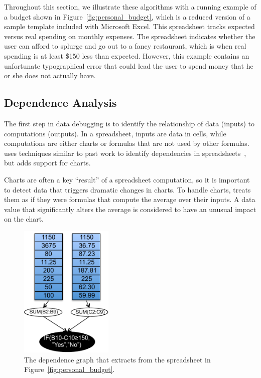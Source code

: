 Throughout this section, we illustrate these algorithms with a running
example of a budget shown in Figure~\ref{fig:personal_budget}, which
is a reduced version of a sample template included with Microsoft Excel. This
spreadsheet tracks expected versus real spending on monthly
expenses. The spreadsheet indicates whether the user can afford to
splurge and go out to a fancy restaurant, which is when real spending
is at least \$150 less than expected. However, this example contains
an unfortunate typographical error that could lead the user to spend
money that he or she does not actually have.


\subsection{Dependence Analysis}

The first step in data debugging is to identify the relationship of
data (inputs) to computations (outputs).
In a spreadsheet, inputs are data in cells, while computations are
either charts or formulas that are not used by other formulas.
\checkcell{} uses techniques similar to past work to identify
dependencies in spreadsheets~\cite{fisher2006scaling}, but adds
support for charts.

Charts are often a key ``result'' of a spreadsheet computation, so it
is important to detect data that triggers dramatic changes in
charts. To handle charts, \checkcell{} treats them as if they were
formulas that compute the average over their inputs. A data value that
significantly alters the average is considered to have an
unusual impact on the chart.

\begin{figure}[!t]
\centering
\includegraphics[width=1.75in]{dependence-graph}
\caption{The dependence graph that \checkcell{} extracts from the spreadsheet in Figure~\ref{fig:personal_budget}.\label{fig:dependence-graph}}
\end{figure}


